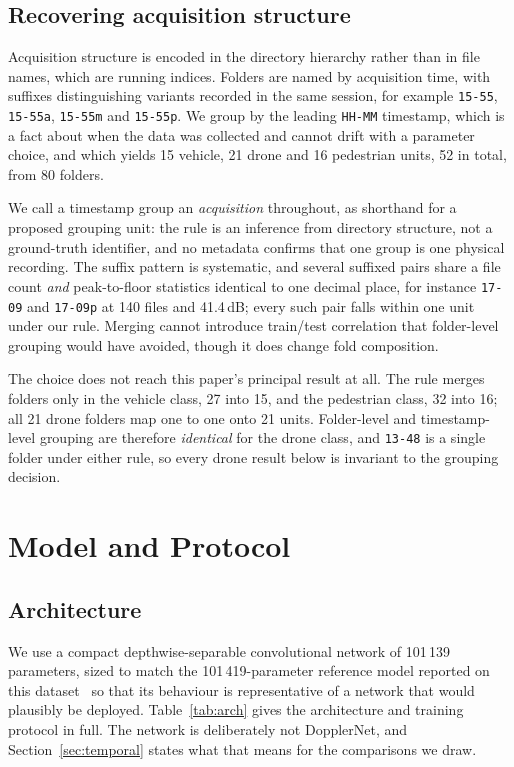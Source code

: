 \documentclass[11pt,a4paper]{article}
\newcommand{\s}[1]{\texttt{#1}}            %
\newcommand{\tgt}{\s{13-48}}               %
\begin{document}
\subsection{Recovering acquisition structure}
\label{sec:grouping}

Acquisition structure is encoded in the directory hierarchy rather than in file names, which are running indices. Folders are named by acquisition time, with suffixes distinguishing variants recorded in the same session, for example \s{15-55}, \s{15-55a}, \s{15-55m} and \s{15-55p}. We group by the leading \s{HH-MM} timestamp, which is a fact about when the data was collected and cannot drift with a parameter choice, and which yields 15 vehicle, 21 drone and 16 pedestrian units, 52 in total, from 80 folders.

We call a timestamp group an \emph{acquisition} throughout, as shorthand for a proposed grouping unit: the rule is an inference from directory structure, not a ground-truth identifier, and no metadata confirms that one group is one physical recording. The suffix pattern is systematic, and several suffixed pairs share a file count \emph{and} peak-to-floor statistics identical to one decimal place, for instance \s{17-09} and \s{17-09p} at 140 files and 41.4\,dB; every such pair falls within one unit under our rule. Merging cannot introduce train/test correlation that folder-level grouping would have avoided, though it does change fold composition.

The choice does not reach this paper's principal result at all. The rule merges folders only in the vehicle class, 27 into 15, and the pedestrian class, 32 into 16; all 21 drone folders map one to one onto 21 units. Folder-level and timestamp-level grouping are therefore \emph{identical} for the drone class, and \tgt{} is a single folder under either rule, so every drone result below is invariant to the grouping decision.

\section{Model and Protocol}
\label{sec:model}

\subsection{Architecture}

We use a compact depthwise-separable convolutional network of 101\,139 parameters, sized to match the 101\,419-parameter reference model reported on this dataset~\cite{zhang2025} so that its behaviour is representative of a network that would plausibly be deployed. Table~\ref{tab:arch} gives the architecture and training protocol in full. The network is deliberately not DopplerNet, and Section~\ref{sec:temporal} states what that means for the comparisons we draw.
\end{document}

